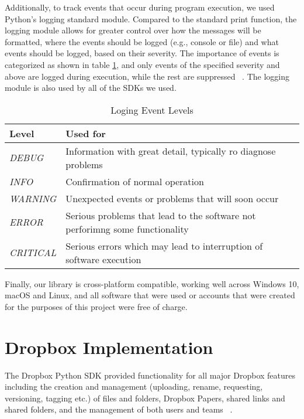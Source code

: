 Additionally, to track events that occur during program execution, we used Python's logging standard module. Compared to the standard print function, the logging module allows for greater control over how the messages will be formatted, where the events should be logged (e.g., console or file) and what events should be logged, based on their severity. The importance of events is categorized as shown in table \ref{tab:Logging_Levels}, and only events of the specified severity and above are logged during execution, while the rest are suppressed ~\cite{python_logging}. The logging module is also used by all of the SDKs we used.

\begin{table}[!h]
	\centering
	\begin{tabular}{|l|l|}
		\hline
		\rowcolor[HTML]{EFEFEF} 
		\textbf{Level} & \textbf{Used for}                \\ \hline
		\textit{DEBUG}    & Information with great detail, typically ro diagnose problems                \\ \hline
		\textit{INFO}  & Confirmation of normal operation \\ \hline
		\textit{WARNING}  & Unexpected events or problems that will soon occur                           \\ \hline
		\textit{ERROR}    & Serious problems that lead to the software not perforimng some functionality \\ \hline
		\textit{CRITICAL} & Serious errors which may lead to interruption of software execution          \\ \hline
	\end{tabular}
	\caption{Loging Event Levels}
	\label{tab:Logging_Levels}
\end{table}

Finally, our library is cross-platform compatible, working well across Windows 10, macOS and Linux, and all software that were used or accounts that were created for the purposes of this project were free of charge.

\section{Dropbox Implementation}
The Dropbox Python SDK provided functionality for all major Dropbox features including the creation and management (uploading, rename, requesting, versioning, tagging etc.)  of files and folders, Dropbox Papers, shared links and shared folders, and the management of both users and teams ~\cite{dropbox_docs}. 

